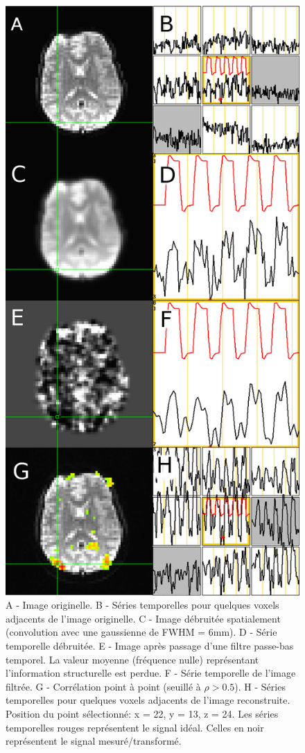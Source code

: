 \documentclass[a4paper]{article}
\begin{document}
\begin{figure}
   \centering
   \includegraphics[height=0.85\textheight]{fmri_reconstruction}
      \caption{\label{fmri_reconstruction} A - Image originelle. B - Séries temporelles pour quelques voxels adjacents de l'image originelle. C - Image débruitée spatialement (convolution avec une gaussienne de FWHM = 6mm). D - Série temporelle débruitée. E - Image après passage d'une filtre passe-bas temporel. La valeur moyenne (fréquence nulle) représentant l'information structurelle est perdue. F - Série temporelle de l'image filtrée. G - Corrélation point à point (seuillé à $\rho > 0.5$). H - Séries temporelles pour quelques voxels adjacents de l'image reconstruite. Position du point sélectionné: x = 22, y = 13, z = 24. Les séries temporelles rouges représentent le signal idéal. Celles en noir représentent le signal mesuré/transformé.}
\end{figure}
\end{document}
